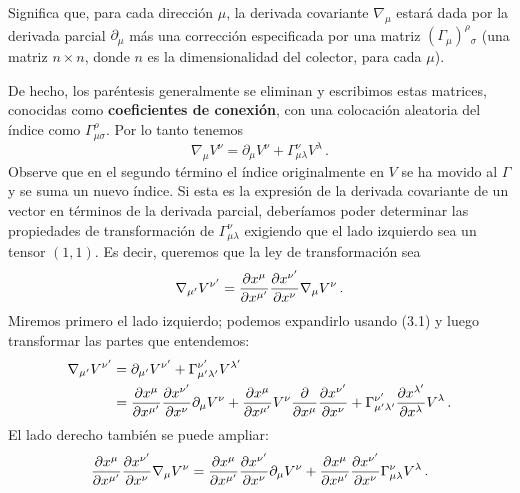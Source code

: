 \documentclass[11pt,b5paper,openany,twoside]{book}
\begin{document}
\begin{CajaColor}
    Significa que, para cada dirección $\mu$, la derivada covariante $\nabla_\mu$ estará dada por la derivada parcial $\partial_\mu$ más una corrección especificada por una matriz $(\Gamma_\mu)^\rho{}_\sigma$ (una matriz $n\times n$, donde $n$ es la dimensionalidad del colector, para cada $\mu$).
\end{CajaColor}

De hecho, los paréntesis generalmente se eliminan y escribimos estas matrices, conocidas como {\bf coeficientes de conexión}, con una colocación aleatoria del índice como $\Gamma^\rho_{\mu\sigma}$.
Por lo tanto tenemos
\begin{equation}
\nabla_\mu V^\nu = \partial_\mu V^\nu + \Gamma^\nu_{\mu\lambda}
V^\lambda\,.\label{3.1}
\end{equation}
Observe que en el segundo término el índice originalmente en $V$ se ha movido al $\Gamma$ y se suma un nuevo índice.
Si esta es la expresión de la derivada covariante de un vector en términos de la derivada parcial, deberíamos poder determinar las propiedades de transformación de $\Gamma^\nu_{\mu\lambda}$ exigiendo que el lado izquierdo sea un tensor $(1,1)$.
Es decir, queremos que la ley de transformación sea
\begin{equation}
\nabla_{\mu'}V^{\nu'} = {{\partial x^\mu}\over{\partial x^{\mu'}}}
{{\partial x^{\nu'}}\over{\partial x^{\nu}}}\nabla_{\mu}V^{\nu}
\,.\label{3.2}
\end{equation}
Miremos primero el lado izquierdo; podemos expandirlo usando (3.1) y luego transformar las partes que entendemos:
\begin{align}
\nabla_{\mu'}V^{\nu'} &= \partial_{\mu'} V^{\nu'}
+ \Gamma^{\nu'}_{\mu'\lambda'}V^{\lambda'} \notag \\
&=  {{\partial x^\mu}\over{\partial x^{\mu'}}}
{{\partial x^{\nu'}}\over{\partial x^{\nu}}}\partial_{\mu} V^{\nu}
+ {{\partial x^\mu}\over{\partial x^{\mu'}}} V^\nu
{{\partial}\over{\partial x^{\mu}}}
{{\partial x^{\nu'}}\over{\partial x^{\nu}}}
+ \Gamma^{\nu'}_{\mu'\lambda'}{{\partial x^{\lambda'}}\over
{\partial x^{\lambda}}}V^{\lambda}\,. \label{3.3}
\end{align}
El lado derecho también se puede ampliar:
\begin{equation}
{{\partial x^\mu}\over{\partial x^{\mu'}}}
{{\partial x^{\nu'}}\over{\partial x^{\nu}}}\nabla_{\mu}V^{\nu}
= {{\partial x^\mu}\over{\partial x^{\mu'}}}
{{\partial x^{\nu'}}\over{\partial x^{\nu}}}\partial_{\mu}V^{\nu}
+ {{\partial x^\mu}\over{\partial x^{\mu'}}}
{{\partial x^{\nu'}}\over{\partial x^{\nu}}}
\Gamma^\nu_{\mu\lambda}V^{\lambda}\,.\label{3.4}
\end{equation}
\end{document}
